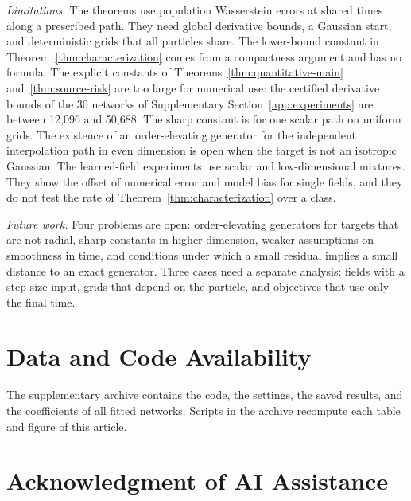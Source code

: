 \emph{Limitations.} The theorems use population Wasserstein errors at
shared times along a prescribed path. They need global derivative
bounds, a Gaussian start, and deterministic grids that all particles
share. The
lower-bound constant in Theorem~\ref{thm:characterization} comes from a
compactness argument and has no formula. The explicit constants of
Theorems~\ref{thm:quantitative-main} and~\ref{thm:source-risk} are too
large for numerical use: the certified derivative bounds of the 30 networks of
Supplementary Section~\ref{app:experiments} are between 12,096 and
50,688. The sharp constant is for one
scalar path on uniform grids. The existence of an order-elevating
generator for the independent interpolation path in even dimension is
open when the target is not an isotropic Gaussian. The learned-field experiments use scalar and
low-dimensional mixtures. They show the offset of numerical error and
model bias for single fields, and they do not test the rate of
Theorem~\ref{thm:characterization} over a class.

\emph{Future work.} Four problems are open: order-elevating generators
for targets that are not radial, sharp constants in higher dimension,
weaker assumptions on smoothness in time, and conditions under which a
small residual implies a small distance to an exact generator. Three cases need a separate analysis: fields with a
step-size input, grids that depend on the particle, and objectives that
use only the final time.

\section*{Data and Code Availability}
The supplementary archive contains the code, the settings, the saved
results, and the coefficients of all fitted networks. Scripts in the archive recompute each table and figure of this
article.

\section*{Acknowledgment of AI Assistance}
\label{sec:ai-disclosure}





